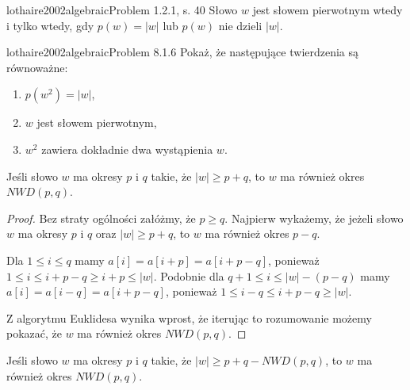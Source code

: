 \begin{problem}{lothaire2002algebraic}{Problem 1.2.1, s. 40}
  Słowo $w$ jest słowem pierwotnym wtedy i tylko wtedy, gdy $p(w) = |w|$ lub $p(w)$ nie dzieli $|w|$.
\end{problem}

\begin{problem}{lothaire2002algebraic}{Problem 8.1.6}
  Pokaż, że następujące twierdzenia są równoważne:
  \begin{enumerate}[label=(\roman*)]
    \item $p(w^2) = |w|$,
    \item $w$ jest słowem pierwotnym,
    \item $w^2$ zawiera dokładnie dwa wystąpienia $w$.
  \end{enumerate} 
\end{problem}

\begin{theorem-thm}
  Jeśli słowo $w$ ma okresy $p$ i $q$ takie, że $|w| \ge p + q$, to $w$ ma również okres $NWD(p, q)$.
\end{theorem-thm}

\begin{proof}
  Bez straty ogólności załóżmy, że $p \ge q$.
  Najpierw wykażemy, że jeżeli słowo $w$ ma okresy $p$ i $q$ oraz $|w| \ge p + q$, to $w$ ma również okres $p - q$.
  
  Dla $1 \le i \le q$ mamy $a[i] = a[i + p] = a[i + p - q]$, ponieważ $1 \le i \le i + p - q \ge i + p \le |w|$.
  Podobnie dla $q + 1 \le i \le |w| - (p - q)$ mamy $a[i] = a[i - q] = a[i + p - q]$, ponieważ $1 \le i - q \le i + p - q \ge |w|$.

  Z algorytmu Euklidesa wynika wprost, że iterując to rozumowanie możemy pokazać, że $w$ ma również okres $NWD(p, q)$.
\end{proof}

\begin{theorem-thm}
  Jeśli słowo $w$ ma okresy $p$ i $q$ takie, że $|w| \ge p + q - NWD(p, q)$, to $w$ ma również okres $NWD(p, q)$.
\end{theorem-thm}


